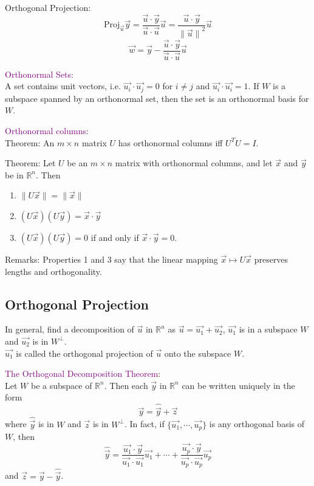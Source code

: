 \documentclass[12pt]{article}
\newcommand\norm[1]{\lVert#1\rVert}
\begin{document}
Orthogonal Projection:
$$\text{Proj}_{\vec{u}} \vec{y} = \dfrac{\vec{u}\cdot\vec{y}}{\vec{u}\cdot\vec{u}}\vec{u} = \dfrac{\vec{u}\cdot\vec{y}}{{\norm{\vec{u}}}^2}\vec{u}$$ 
$$\vec{w} = \vec{y} - \dfrac{\vec{u}\cdot\vec{y}}{\vec{u}\cdot\vec{u}}\vec{u}$$


\textcolor{purple}{Orthonormal Sets}:\\
A set contains unit vectors, i.e. $\vec{u_i} \cdot \vec{u_j} = 0$ for $i \neq j$ and $\vec{u_i} \cdot \vec{u_i} = 1$. If $W$ is a subspace spanned by an orthonormal set, then the set is an orthonormal basis for $W$.

\textcolor{purple}{Orthonormal columns}:\\
Theorem: An $m\times n$ matrix $U$ has orthonormal columns iff $U^TU = I$. 

Theorem: Let $U$ be an $m\times n$ matrix with orthonormal columns, and let $\vec{x}$ and $\vec{y}$ be in $\mathbb{R}^n$. Then
\begin{enumerate}
    \item $\norm{U\vec{x}} = \norm{\vec{x}}$
    \item $(U\vec{x})(U\vec{y}) = \vec{x}\cdot\vec{y}$
    \item $(U\vec{x})(U\vec{y}) = 0$ if and only if $\vec{x}\cdot\vec{y} = 0$. 
\end{enumerate}


Remarks: Properties 1 and 3 say that the linear mapping $\vec{x}\longmapsto U\vec{x}$ preserves lengths and orthogonality.




\subsection{Orthogonal Projection}
In general, find a decomposition of $\vec{u}$ in $\mathbb{R}^n$ as $\vec{u} = \vec{u_1} + \vec{u_2}$, $\vec{u_1}$ is in a subspace $W$ and $\vec{u_2}$ is in $W^\perp$.\\
$\vec{u_1}$ is called the orthogonal projection of $\vec{u}$ onto the subspace $W$.

\textcolor{purple}{The Orthogonal Decomposition Theorem}:\\
Let $W$ be a subspace of $\mathbb{R}^n$. Then each $\vec{y}$ in $\mathbb{R}^n$ can be written uniquely in the form $$\vec{y} = \hat{\vec{y}} + \vec{z}$$
where $\hat{\vec{y}}$ is in $W$ and $\vec{z}$ is in $W^\perp$. In fact, if $\{\vec{u_1}, \cdots, \vec{u_p}\}$ is any orthogonal basis of $W$, then 
$$\hat{\vec{y}} = \dfrac{\vec{u_1}\cdot\vec{y}}{\vec{u_1}\cdot\vec{u_1}}\vec{u_1} + \cdots + \dfrac{\vec{u_p}\cdot\vec{y}}{\vec{u_p}\cdot\vec{u_p}}\vec{u_p}$$
and $\vec{z} = \vec{y} - \hat{\vec{y}}$.
\end{document}

